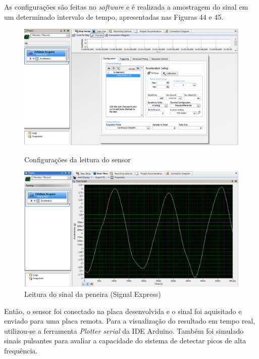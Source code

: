 \documentclass[
	12pt,				%
	openright,			%
	twoside,			%
	a4paper,			%
	english,			%
	french,				%
	spanish,			%
	brazil,				%
	]{abntex2}
\begin{document}
		As configurações são feitas no \textit{software} e é realizada a
		amostragem do sinal em um determinado intervalo de tempo,
		apresentadas nas Figuras 44 e 45.

		\begin{figure}[!ht]
			\centering
			\begin{minipage}{0.4\linewidth}
				\centering
				\includegraphics[width = \linewidth]{../Fotos/configSignalExpress.png}
				\caption{Configurações da leitura do sensor}
			\end{minipage}
			\hfill\vline\hfill
			\begin{minipage}{0.4\linewidth}
				\centering
				\includegraphics[width = \linewidth]{../Fotos/signalExpress3g.png}
				\caption{Leitura do sinal da peneira (Signal Express)}
			\end{minipage}
		\end{figure}

		Então, o sensor foi conectado na placa desenvolvida e o sinal foi
		aquisitado e enviado para uma placa remota. Para a visualização
		do resultado em tempo real, utilizou-se a ferramenta
		\textit{Plotter serial} da IDE Arduino. Também foi simulado
		sinais pulsantes para avaliar a capacidade do sistema de
		detectar picos de alta frequência.
\end{document}
